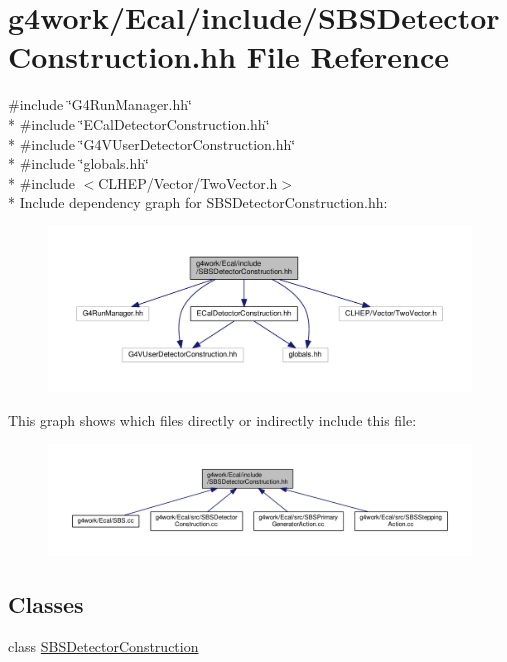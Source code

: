 \hypertarget{_s_b_s_detector_construction_8hh}{\section{g4work/\-Ecal/include/\-S\-B\-S\-Detector\-Construction.hh File Reference}
\label{_s_b_s_detector_construction_8hh}
}
{\ttfamily \#include \char`\"{}G4\-Run\-Manager.\-hh\char`\"{}}\\*
{\ttfamily \#include \char`\"{}E\-Cal\-Detector\-Construction.\-hh\char`\"{}}\\*
{\ttfamily \#include \char`\"{}G4\-V\-User\-Detector\-Construction.\-hh\char`\"{}}\\*
{\ttfamily \#include \char`\"{}globals.\-hh\char`\"{}}\\*
{\ttfamily \#include $<$C\-L\-H\-E\-P/\-Vector/\-Two\-Vector.\-h$>$}\\*
Include dependency graph for S\-B\-S\-Detector\-Construction.\-hh\-:\nopagebreak
\begin{figure}[H]
\begin{center}
\leavevmode
\includegraphics[width=350pt]{_s_b_s_detector_construction_8hh__incl}
\end{center}
\end{figure}
This graph shows which files directly or indirectly include this file\-:\nopagebreak
\begin{figure}[H]
\begin{center}
\leavevmode
\includegraphics[width=350pt]{_s_b_s_detector_construction_8hh__dep__incl}
\end{center}
\end{figure}
\subsection*{Classes}
\begin{DoxyCompactItemize}
\item 
class \hyperlink{class_s_b_s_detector_construction}{S\-B\-S\-Detector\-Construction}
\end{DoxyCompactItemize}
